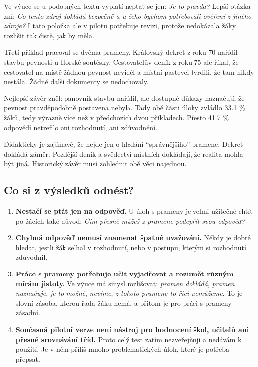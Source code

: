 \documentclass[
  12pt,
  english,
  a4paper,
  extrafontsizes,onecolumn,openright
  ]{memoir}
\providecommand{\tightlist}{%
  \setlength{\itemsep}{0pt}\setlength{\parskip}{0pt}}
\begin{document}
Ve výuce se u podobných textů vyplatí neptat se jen: \emph{Je to pravda?} Lepší
otázka zní: \emph{Co tento zdroj dokládá bezpečně a u čeho bychom potřebovali
ověření z jiného zdroje?} I tato položka ale v pilotu potřebuje revizi,
protože nedokázala žáky rozlišit tak čistě, jak by měla.

Třetí příklad pracoval se dvěma prameny. Královský dekret z roku 70 nařídil
stavbu pevnosti u Horské soutěsky. Cestovatelův deník z roku 75 ale říkal,
že cestovatel na místě žádnou pevnost neviděl a místní pastevci tvrdili,
že tam nikdy nestála. Žádné další dokumenty se nedochovaly.

Nejlepší závěr zněl: panovník stavbu nařídil, ale dostupné důkazy
naznačují, že pevnost pravděpodobně postavena nebyla. Tady obě části úlohy
zvládlo 33.1 \%
žáků, tedy výrazně více než v předchozích dvou příkladech. Přesto
41.7 \% odpovědí
netrefilo ani rozhodnutí, ani zdůvodnění.

Didakticky je zajímavé, že nejde jen o hledání \enquote{správnějšího} pramene.
Dekret dokládá záměr. Pozdější deník a svědectví místních dokládají, že
realita mohla být jiná. Historický závěr musí zohlednit obě věci najednou.

\subsection{Co si z výsledků odnést?}\label{co-si-z-vuxfdsledkux16f-odnuxe9st}

\begin{enumerate}
\def\labelenumi{\arabic{enumi}.}
\tightlist
\item
  \textbf{Nestačí se ptát jen na odpověď.} U úloh s prameny je velmi užitečné
  chtít po žácích také důvod: \emph{Čím přesně můžeš z pramene podepřít svou odpověď?}
\item
  \textbf{Chybná odpověď nemusí znamenat špatné uvažování.} Někdy je dobré
  hledat, jestli žák selhal v rozhodnutí, nebo v postupu, kterým si
  rozhodnutí zdůvodnil.
\item
  \textbf{Práce s prameny potřebuje učit vyjadřovat a rozumět různým mírám jistoty.} Ve výuce má smysl
  rozlišovat: \emph{pramen dokládá}, \emph{pramen naznačuje}, \emph{je to možné},
  \emph{nevíme}, \emph{z tohoto pramene to říci nemůžeme}. To je slovní zásoba,
  kterou řada žáku nemá, a přitom je pro práci s prameny zásadní.
\item
  \textbf{Současná pilotní verze není nástroj pro hodnocení škol, učitelů ani přesné srovnávání tříd.}
  Proto celý test zatím nezveřejňuji a nedávám k použití. Je v něm příliš
  mnoho problematických úloh, které je potřeba přepsat.
\end{enumerate}
\end{document}
